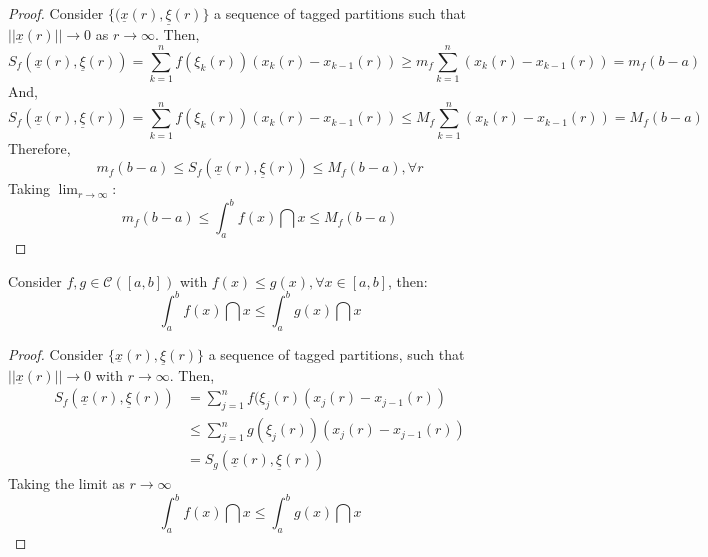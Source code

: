 \begin{proof}
    Consider $\{ (\underline{x}(r), \underline{\xi}(r)\}$ a sequence of tagged partitions such that $|| \underline{x}(r) || \to 0$ as $r \to \infty$. Then,
    \begin{equation*}
        S_f(\underline{x}(r), \underline{\xi}(r)) = \sum \limits_{k=1}^n f(\xi_k(r))(x_k(r) - x_{k-1}(r)) \geq m_f \sum \limits_{k=1}^n (x_k(r) - x_{k-1}(r)) = m_f(b-a)
    \end{equation*}
    And,
    \begin{equation*}
        S_f(\underline{x}(r), \underline{\xi}(r)) = \sum \limits_{k=1}^n f(\xi_k(r))(x_k(r) - x_{k-1}(r)) \leq M_f \sum \limits_{k=1}^n (x_k(r) - x_{k-1}(r)) = M_f(b-a)
    \end{equation*}
    Therefore,
    \begin{equation*}
        m_f(b-a) \leq S_f(\underline{x}(r), \underline{\xi}(r)) \leq M_f(b-a), \forall r
    \end{equation*}
    Taking $\lim_{r \to \infty}$:
    \begin{equation*}
        m_f(b-a) \leq \int_a^b f(x) \dint x \leq M_f(b-a)
    \end{equation*}
\end{proof}

\begin{theorem}
    Consider $f, g \in \mathcal{C}([a,b])$ with $f(x) \leq g(x), \forall x \in [a,b]$, then:
    \begin{equation*}
        \int_a^b f(x) \dint x \leq \int_a^b g(x) \dint x
    \end{equation*}
\end{theorem}

\begin{proof}
    Consider $\{\underline{x}(r), \underline{\xi}(r)\}$ a sequence of tagged partitions, such that $||\underline{x}(r)|| \to 0$ with $r \to \infty$. Then,
    \begin{align*}
        S_f(\underline{x}(r), \underline{\xi}(r)) &= \sum \limits_{j=1}^n f(\xi_j(r)(x_j(r) - x_{j-1}(r)) \\
        &\leq \sum \limits_{j=1}^n g(\xi_j(r))(x_j(r) - x_{j-1}(r)) \\
        &=S_g(\underline{x}(r), \underline{\xi}(r))
    \end{align*}
    Taking the limit as $r \to \infty$
    \begin{equation*}
        \int_a^b f(x) \dint x \leq \int_a^b g(x) \dint x
    \end{equation*}
\end{proof}

